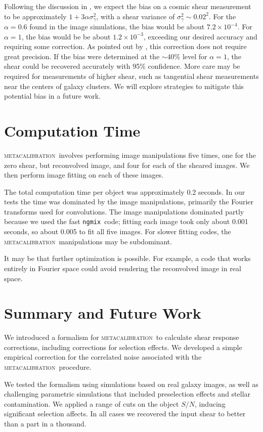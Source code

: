 \documentclass[iop]{emulateapj}
\newcommand{\snr}{$S/N$}
\newcommand{\mcal}{\textsc{metacalibration}}
\newcommand{\ngmix}{\texttt{ngmix}}
\begin{document}
Following the discussion in \cite{bfd2016}, we expect the bias on a cosmic
shear measurement to be approximately $1 + 3\alpha\sigma_\gamma^2$, with a
shear variance of $\sigma_\gamma^2 \sim 0.02^2$.  For the $\alpha=0.6$ found in
the image simulations, the bias would be about $7.2 \times 10^{-4}$. 
For $\alpha=1$, the bias would be be about $1.2 \times 10^{-3}$, exceeding our
desired accuracy and requiring some correction.  As pointed out by
\cite{bfd2016}, this correction does not require great precision.  If the bias
were determined at the $\sim 40$\% level for $\alpha=1$,  the shear could be
recovered accurately with 95\% confidence.  More care may be required for
measurements of higher shear, such as tangential shear measurements near the
centers of galaxy clusters.  We will explore strategies to mitigate this
potential bias in a future work.  

\section{Computation Time}

\mcal\ involves performing image manipulations five times, one for the zero
shear, but reconvolved image, and four for each of the sheared images.
We then perform image fitting on each of these images.

The total computation time per object was approximately 0.2 seconds.  In our
tests the time was dominated by the image manipulations, primarily the Fourier
transforms used for convolutions.  The image manipulations dominated partly
because we used the fast \ngmix\ code; fitting each image took only about 0.001
seconds, so about 0.005 to fit all five images.  For slower fitting codes, the
\mcal\ manipulations may be subdominant.

It may be that further optimization is possible.  For example, a code that
works entirely in Fourier space could avoid rendering the reconvolved image in
real space.

\section{Summary and Future Work} \label{sec:summary}

We introduced a formalism for \mcal\ to calculate shear response corrections,
including corrections for selection effects. We developed a simple empirical
correction for the correlated noise associated with the \mcal\ procedure.

We tested the formalism using simulations based on real galaxy images, as well
as challenging parametric simulations that included preselection effects and
stellar contamination.  We applied a range of cuts on the object \snr, inducing
significant selection affects.  In all cases we recovered the input shear to
better than a part in a thousand.
\end{document}
